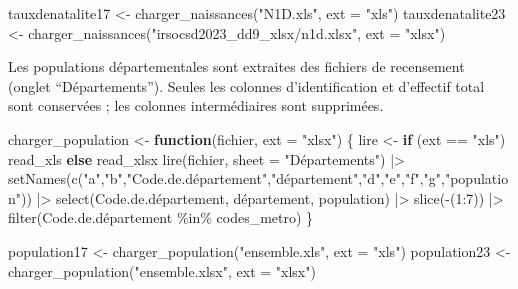 \documentclass[
  letterpaper,
  DIV=11,
  numbers=noendperiod]{scrartcl}
\newenvironment{Shaded}{\begin{snugshade}}{\end{snugshade}}
\newcommand{\AttributeTok}[1]{\textcolor[rgb]{0.40,0.45,0.13}{#1}}
\newcommand{\ControlFlowTok}[1]{\textcolor[rgb]{0.00,0.23,0.31}{\textbf{#1}}}
\newcommand{\DecValTok}[1]{\textcolor[rgb]{0.68,0.00,0.00}{#1}}
\newcommand{\FunctionTok}[1]{\textcolor[rgb]{0.28,0.35,0.67}{#1}}
\newcommand{\NormalTok}[1]{\textcolor[rgb]{0.00,0.23,0.31}{#1}}
\newcommand{\OtherTok}[1]{\textcolor[rgb]{0.00,0.23,0.31}{#1}}
\newcommand{\SpecialCharTok}[1]{\textcolor[rgb]{0.37,0.37,0.37}{#1}}
\newcommand{\StringTok}[1]{\textcolor[rgb]{0.13,0.47,0.30}{#1}}
\begin{document}
\begin{Shaded}
\begin{Highlighting}[]
\NormalTok{tauxdenatalite17 }\OtherTok{\textless{}{-}} \FunctionTok{charger\_naissances}\NormalTok{(}\StringTok{"N1D.xls"}\NormalTok{,  }\AttributeTok{ext =} \StringTok{"xls"}\NormalTok{)}
\NormalTok{tauxdenatalite23 }\OtherTok{\textless{}{-}} \FunctionTok{charger\_naissances}\NormalTok{(}\StringTok{"irsocsd2023\_dd9\_xlsx/n1d.xlsx"}\NormalTok{, }\AttributeTok{ext =} \StringTok{"xlsx"}\NormalTok{)}
\end{Highlighting}
\end{Shaded}

Les populations départementales sont extraites des fichiers de
recensement (onglet ``Départements''). Seules les colonnes
d'identification et d'effectif total sont conservées ; les colonnes
intermédiaires sont supprimées.

\begin{Shaded}
\begin{Highlighting}[]
\NormalTok{charger\_population }\OtherTok{\textless{}{-}} \ControlFlowTok{function}\NormalTok{(fichier, }\AttributeTok{ext =} \StringTok{"xlsx"}\NormalTok{) \{}
\NormalTok{  lire }\OtherTok{\textless{}{-}} \ControlFlowTok{if}\NormalTok{ (ext }\SpecialCharTok{==} \StringTok{"xls"}\NormalTok{) read\_xls }\ControlFlowTok{else}\NormalTok{ read\_xlsx}
  \FunctionTok{lire}\NormalTok{(fichier, }\AttributeTok{sheet =} \StringTok{"Départements"}\NormalTok{) }\SpecialCharTok{|\textgreater{}}
    \FunctionTok{setNames}\NormalTok{(}\FunctionTok{c}\NormalTok{(}\StringTok{"a"}\NormalTok{,}\StringTok{"b"}\NormalTok{,}\StringTok{"Code.de.département"}\NormalTok{,}\StringTok{"département"}\NormalTok{,}\StringTok{"d"}\NormalTok{,}\StringTok{"e"}\NormalTok{,}\StringTok{"f"}\NormalTok{,}\StringTok{"g"}\NormalTok{,}\StringTok{"population"}\NormalTok{)) }\SpecialCharTok{|\textgreater{}}
    \FunctionTok{select}\NormalTok{(Code.de.département, département, population) }\SpecialCharTok{|\textgreater{}}
    \FunctionTok{slice}\NormalTok{(}\SpecialCharTok{{-}}\NormalTok{(}\DecValTok{1}\SpecialCharTok{:}\DecValTok{7}\NormalTok{)) }\SpecialCharTok{|\textgreater{}}
    \FunctionTok{filter}\NormalTok{(Code.de.département }\SpecialCharTok{\%in\%}\NormalTok{ codes\_metro)}
\NormalTok{\}}

\NormalTok{population17 }\OtherTok{\textless{}{-}} \FunctionTok{charger\_population}\NormalTok{(}\StringTok{"ensemble.xls"}\NormalTok{, }\AttributeTok{ext =} \StringTok{"xls"}\NormalTok{)}
\NormalTok{population23 }\OtherTok{\textless{}{-}} \FunctionTok{charger\_population}\NormalTok{(}\StringTok{"ensemble.xlsx"}\NormalTok{, }\AttributeTok{ext =} \StringTok{"xlsx"}\NormalTok{)}
\end{Highlighting}
\end{Shaded}
\end{document}
